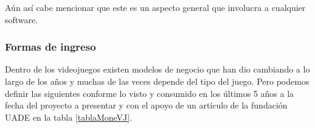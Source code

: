 \begin{table}[htbp]
	\centering
	\caption{Tabla comparativa de un producto físico o digital por Velneo \cite{velneo2015}}
	\label{fiDi}
\end{table}

Aún así cabe mencionar que este es un aspecto general que involucra a cualquier software.

\subsubsection{Formas de ingreso}
Dentro de los videojuegos existen modelos de negocio que han dio cambiando a lo largo de los años y muchas de las veces depende del tipo del juego. Pero podemos definir las siguientes conforme lo visto y consumido en los últimos 5 años a la fecha del proyecto a presentar y con el apoyo de un artículo de la fundación UADE \cite{fundaciónuade2014} en la tabla \ref{tablaMoneVJ}.

